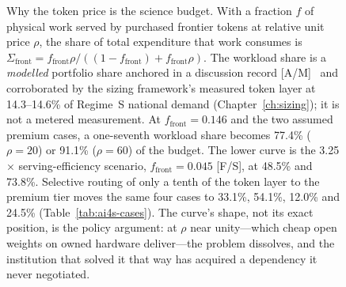 \begin{figure}[htbp]
\centering
{}
\caption[The AI4S expenditure asymmetry]{Why the token price is the science budget. With a fraction $f$ of
physical work served by purchased frontier tokens at relative unit price $\rho$, the share of total expenditure that
work consumes is $\Sigma_{\mathrm{front}}=f_{\mathrm{front}}\rho/((1-f_{\mathrm{front}})+f_{\mathrm{front}}\rho)$. The
workload share is a \emph{modelled} portfolio share anchored in a discussion record [A/M]~\cite{consortium-record} and
corroborated by the sizing framework's measured token layer at 14.3--14.6\% of Regime~S national demand
(Chapter~\ref{ch:sizing}); it is not a metered measurement. At $f_{\mathrm{front}}=0.146$ and the two assumed premium
cases, a one-seventh workload share becomes 77.4\% ($\rho=20$) or 91.1\% ($\rho=60$) of the budget. The lower curve is
the 3.25$\times$ serving-efficiency scenario, $f_{\mathrm{front}}=0.045$ [F/S], at 48.5\% and 73.8\%. Selective
routing of only a tenth of the token layer to the premium tier moves the same four cases to 33.1\%, 54.1\%, 12.0\% and
24.5\% (Table~\ref{tab:ai4s-cases}). The curve's shape, not its exact position, is the policy argument: at $\rho$ near
unity---which cheap open weights on owned hardware deliver---the problem dissolves, and the institution that solved it
that way has acquired a dependency it never negotiated.}
\label{fig:ai4s-cost}
\end{figure}
